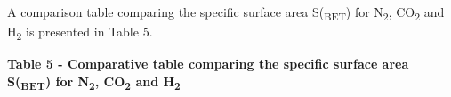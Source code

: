 A comparison table comparing the specific surface area
S(\textsubscript{BET}) for N\textsubscript{2}, CO\textsubscript{2} and
H\textsubscript{2} is presented in Table 5.

{\bfseries Table 5 - Comparative table comparing the specific surface area
S(\textsubscript{BET}) for N\textsubscript{2}, CO\textsubscript{2} and
H\textsubscript{2}}

